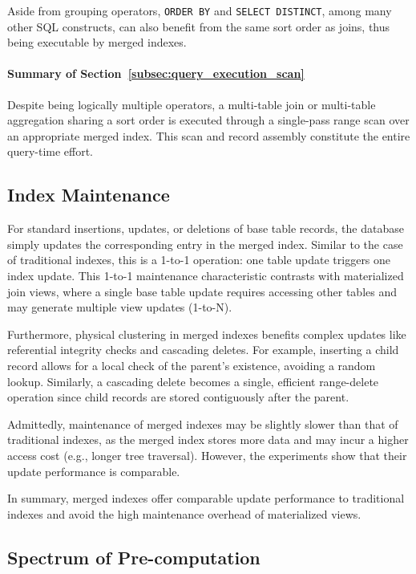 \documentclass[sigconf, pdfa, nonacm]{acmart}
\newcommand\summary[1]{\paragraph{\textbf{#1}}}
\begin{document}
Aside from grouping operators, \texttt{ORDER BY} and \texttt{SELECT DISTINCT}, among many other SQL constructs, can also benefit from the same sort order as joins, thus being executable by merged indexes.

\summary{Summary of Section~\ref{subsec:query_execution_scan}}\label{sssec:summary_query_execution_scan}

Despite being logically multiple operators, a multi-table join or multi-table aggregation sharing a sort order is executed through a single-pass range scan over an appropriate merged index. This scan and record assembly constitute the entire query-time effort.

\subsection{Index Maintenance}\label{subsec:maintenance} 

For standard insertions, updates, or deletions of base table records, the database simply updates the corresponding entry in the merged index.
Similar to the case of traditional indexes, this is a 1-to-1 operation: one table update triggers one index update.
This 1-to-1 maintenance characteristic contrasts with materialized join views, where a single base table update requires accessing other tables and may generate multiple view updates (1-to-N).

Furthermore, physical clustering in merged indexes benefits complex updates like referential integrity checks and cascading deletes. For example, inserting a child record allows for a local check of the parent's existence, avoiding a random lookup. Similarly, a cascading delete becomes a single, efficient range-delete operation since child records are stored contiguously after the parent.

Admittedly, maintenance of merged indexes may be slightly slower than that of traditional indexes, as the merged index stores more data and may incur a higher access cost (e.g., longer tree traversal). However, the experiments show that their update performance is comparable.

In summary, merged indexes offer comparable update performance to traditional indexes and avoid the high maintenance overhead of materialized views.

\subsection{Spectrum of Pre-computation}\label{subsec:spec-precomp}
\end{document}
